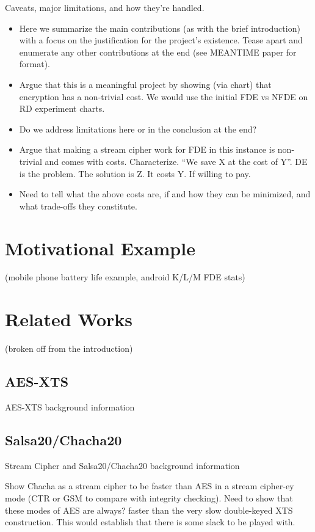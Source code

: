 \documentclass[letterpaper,twocolumn,10pt]{article}
\begin{document}
Caveats, major limitations, and how they're handled.

\begin{itemize}
  \item Here we summarize the main contributions (as with the brief introduction) with a focus on the justification for
  the project's existence. Tease apart and enumerate any other contributions at the end (see MEANTIME paper for format).
  \item Argue that this is a meaningful project by showing (via chart) that encryption has a non-trivial cost. We would 
  use the initial FDE vs  NFDE on RD experiment charts.
  \item Do we address limitations here or in the conclusion at the end?
  \item Argue that making a stream cipher work for FDE in this instance is non-trivial and comes with costs. Characterize.
  ``We save X at the cost of Y''. DE is the problem. The solution is Z. It costs Y. If willing to pay.
  \item Need to tell what the above costs are, if and how they can be minimized, and what trade-offs they constitute.
\end{itemize}

\section{Motivational Example}
(mobile phone battery life example, android K/L/M FDE stats)

\section{Related Works}
(broken off from the introduction)

\subsection{AES-XTS}
AES-XTS background information

\subsection{Salsa20/Chacha20}
Stream Cipher and Salsa20/Chacha20 background information

Show Chacha as a stream cipher to be faster than AES in a stream cipher-ey mode (CTR or GSM to compare with integrity
checking). Need to show that these modes of AES are always? faster than the very slow double-keyed XTS construction.
This would establish that there is some slack to be played with.
\end{document}
